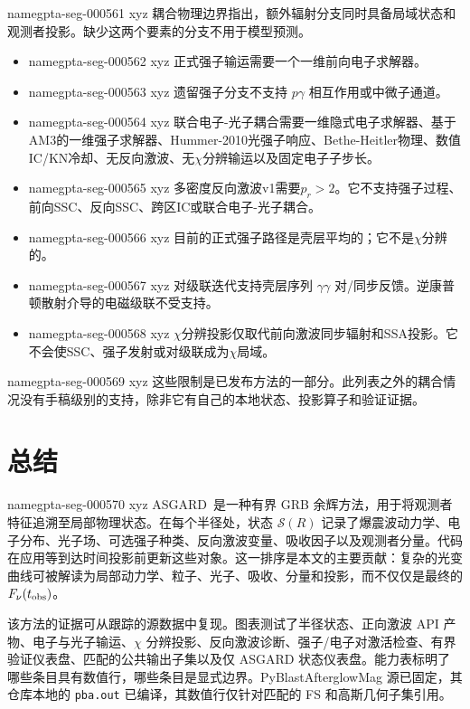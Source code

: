 \documentclass[twocolumn]{aastex702}
\makeatletter
\newcommand{\asgard}{\textsc{ASGARD}}
\providecommand{\gptareaderanchor}[1]{\pdfdest name{#1} xyz}%
\providecommand{\gptareaderanchor}[1]{\special{pdf:dest (#1) [ @thispage /XYZ @xpos @ypos null ]}}%
\makeatother
\begin{document}
\gptareaderanchor{gpta-seg-000561}%
耦合物理边界指出，额外辐射分支同时具备局域状态和观测者投影。缺少这两个要素的分支不用于模型预测。
\begin{itemize}
\item
\gptareaderanchor{gpta-seg-000562}%
正式强子输运需要一个一维前向电子求解器。
\item
\gptareaderanchor{gpta-seg-000563}%
遗留强子分支不支持 \(p\gamma\) 相互作用或中微子通道。
\item
\gptareaderanchor{gpta-seg-000564}%
联合电子-光子耦合需要一维隐式电子求解器、基于AM3的一维强子求解器、Hummer-2010光强子响应、Bethe-Heitler物理、数值IC/KN冷却、无反向激波、无\(\chi\)分辨输运以及固定电子子步长。
\item
\gptareaderanchor{gpta-seg-000565}%
多密度反向激波v1需要\(p_r>2\)。它不支持强子过程、前向SSC、反向SSC、跨区IC或联合电子-光子耦合。
\item
\gptareaderanchor{gpta-seg-000566}%
目前的正式强子路径是壳层平均的；它不是\(\chi\)分辨的。
\item
\gptareaderanchor{gpta-seg-000567}%
对级联迭代支持壳层序列 \(\gamma\gamma\) 对/同步反馈。逆康普顿散射介导的电磁级联不受支持。
\item
\gptareaderanchor{gpta-seg-000568}%
\(\chi\)分辨投影仅取代前向激波同步辐射和SSA投影。它不会使SSC、强子发射或对级联成为\(\chi\)局域。
\end{itemize}

\gptareaderanchor{gpta-seg-000569}%
这些限制是已发布方法的一部分。此列表之外的耦合情况没有手稿级别的支持，除非它有自己的本地状态、投影算子和验证证据。

\section{总结} \label{sec:summary}


\gptareaderanchor{gpta-seg-000570}%
\asgard\ 是一种有界 GRB 余辉方法，用于将观测者特征追溯至局部物理状态。在每个半径处，状态 \(\mathcal{S}(R)\) 记录了爆震波动力学、电子分布、光子场、可选强子种类、反向激波变量、吸收因子以及观测者分量。代码在应用等到达时间投影前更新这些对象。这一排序是本文的主要贡献：复杂的光变曲线可被解读为局部动力学、粒子、光子、吸收、分量和投影，而不仅仅是最终的 \(F_\nu(t_{\rm obs})\)。

该方法的证据可从跟踪的源数据中复现。图表测试了半径状态、正向激波 API 产物、电子与光子输运、\(\chi\) 分辨投影、反向激波诊断、强子/电子对激活检查、有界验证仪表盘、匹配的公共输出子集以及仅 ASGARD 状态仪表盘。能力表标明了哪些条目具有数值行，哪些条目是显式边界。PyBlastAfterglowMag 源已固定，其仓库本地的 \texttt{pba.out} 已编译，其数值行仅针对匹配的 FS 和高斯几何子集引用。
\end{document}
